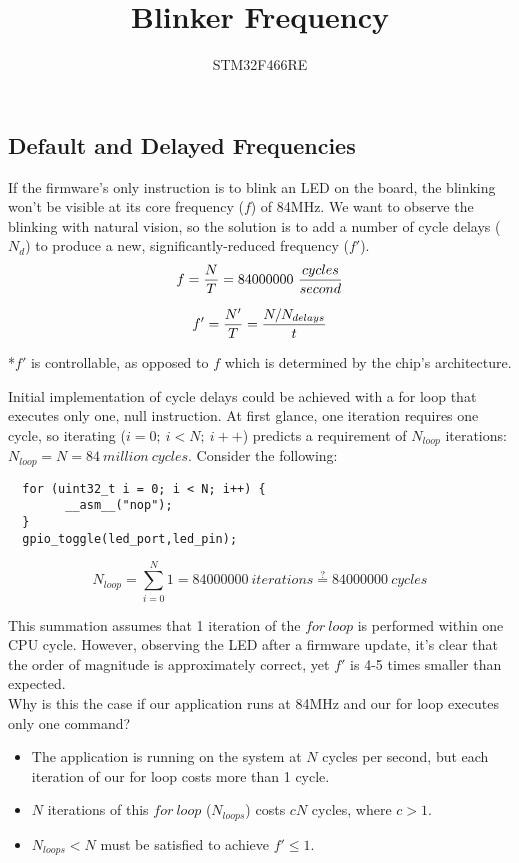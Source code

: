 \documentclass[a4paper,12pt]{article}   	%
\title{Blinker Frequency}
\author{STM32F466RE}
\begin{document}
\maketitle

\subsection*{Default and Delayed Frequencies}
\large
If the firmware's only instruction is to blink an LED on the board,
the blinking won't be visible at its core 
frequency ($f$) of 84MHz. We want to observe the blinking 
with natural vision, so the solution 
is to add a number of cycle delays ($N_d$) to produce a new, 
significantly-reduced frequency ($f'$).\\[1 ex]

$$f = \frac{N}{T} = 84000000\ \frac{cycles}{second}\\[3 ex]$$

$$f' = \frac{N'}{T} = \frac{N/N_{delays}}{t}\\[3 ex]$$
\large

\normalsize
*$f'$ is controllable, as opposed to $f$ which is determined by the chip's architecture.

\large
\begin{flushleft}
Initial implementation of cycle delays could be achieved
with a 
for loop that executes only one, null instruction. At first 
glance, one iteration requires one cycle, so iterating ($i = 0;\ i < N;\ i++$)
predicts a requirement of $N_{loop}$ iterations: $N_{loop} = N = 84\ million\ cycles$. Consider the following:\\[1 ex] 

\begin{lstlisting}
  for (uint32_t i = 0; i < N; i++) {
        __asm__("nop");
  }
  gpio_toggle(led_port,led_pin);
  \end{lstlisting}
  $$N_{loop} = \sum_{i=0}^{N}1 = 84000000\ iterations \stackrel{?}{=} 84000000\ cycles$$

This summation assumes that 1 iteration of the $for\ loop$ is performed within one CPU cycle. However,
observing the LED after a firmware update, it's clear that the order of magnitude is approximately correct, 
yet $f'$ is 4-5 times smaller than expected.\\[2 ex]

Why is this the case 
if our application runs at 84MHz and our for loop executes only one command?\\[1 ex]

\end{flushleft}
\begin{itemize}
\setlength{\itemindent}{0.4in}
    \item The application is running on the system at $N$ cycles per second, 
    but each iteration of our for loop 
    costs more than 1 cycle. 
    \item $N$ iterations of this $for\ loop$ ($N_{loops}$) costs $cN$ cycles, where $c > 1$.
    \item $N_{loops} < N$ must be satisfied to achieve $f' \le 1.$
\end{itemize}
\end{document}
